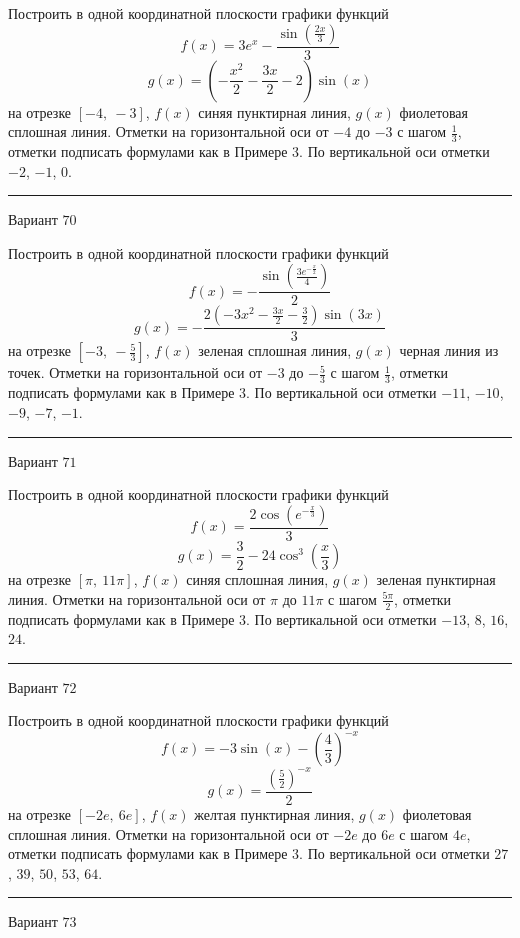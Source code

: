 \documentclass[11pt]{report}
\begin{document}
Построить в одной координатной плоскости графики функций $$f(x) = 3 e^{x} - \frac{\sin{\left(\frac{2 x}{3} \right)}}{3}$$ $$g(x) = \left(- \frac{x^{2}}{2} - \frac{3 x}{2} - 2\right) \sin{\left(x \right)}$$ на отрезке $\left[-4, \  -3\right]$, $f(x)$ синяя пунктирная линия, $g(x)$ фиолетовая сплошная линия. Отметки на горизонтальной оси от $-4$ до $-3$ с шагом $\frac{1}{3}$, отметки подписать формулами как в Примере 3. По вертикальной оси отметки $-2$, $-1$, $0$.
\begin{center}
\noindent\rule{8cm}{0.4pt}
\end{center}
Вариант $70$


Построить в одной координатной плоскости графики функций $$f(x) = - \frac{\sin{\left(\frac{3 e^{- \frac{x}{2}}}{4} \right)}}{2}$$ $$g(x) = - \frac{2 \left(- 3 x^{2} - \frac{3 x}{2} - \frac{3}{2}\right) \sin{\left(3 x \right)}}{3}$$ на отрезке $\left[-3, \  - \frac{5}{3}\right]$, $f(x)$ зеленая сплошная линия, $g(x)$ черная линия из точек. Отметки на горизонтальной оси от $-3$ до $- \frac{5}{3}$ с шагом $\frac{1}{3}$, отметки подписать формулами как в Примере 3. По вертикальной оси отметки $-11$, $-10$, $-9$, $-7$, $-1$.
\begin{center}
\noindent\rule{8cm}{0.4pt}
\end{center}
Вариант $71$


Построить в одной координатной плоскости графики функций $$f(x) = \frac{2 \cos{\left(e^{- \frac{x}{3}} \right)}}{3}$$ $$g(x) = \frac{3}{2} - 24 \cos^{3}{\left(\frac{x}{3} \right)}$$ на отрезке $\left[\pi, \  11 \pi\right]$, $f(x)$ синяя сплошная линия, $g(x)$ зеленая пунктирная линия. Отметки на горизонтальной оси от $\pi$ до $11 \pi$ с шагом $\frac{5 \pi}{2}$, отметки подписать формулами как в Примере 3. По вертикальной оси отметки $-13$, $8$, $16$, $24$.
\begin{center}
\noindent\rule{8cm}{0.4pt}
\end{center}
Вариант $72$


Построить в одной координатной плоскости графики функций $$f(x) = - 3 \sin{\left(x \right)} - \left(\frac{4}{3}\right)^{- x}$$ $$g(x) = \frac{\left(\frac{5}{2}\right)^{- x}}{2}$$ на отрезке $\left[- 2 e, \  6 e\right]$, $f(x)$ желтая пунктирная линия, $g(x)$ фиолетовая сплошная линия. Отметки на горизонтальной оси от $- 2 e$ до $6 e$ с шагом $4 e$, отметки подписать формулами как в Примере 3. По вертикальной оси отметки $27$, $39$, $50$, $53$, $64$.
\begin{center}
\noindent\rule{8cm}{0.4pt}
\end{center}
Вариант $73$
\end{document}
